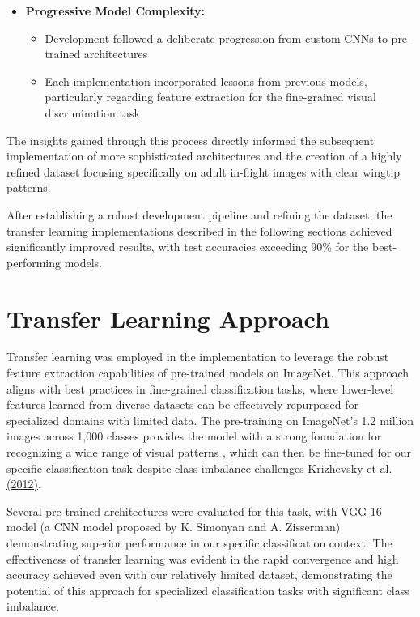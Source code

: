 \documentclass[a4paper,12pt]{report}
\begin{document}
\begin{itemize}
    \item \textbf{Progressive Model Complexity:}
    \begin{itemize}
        \item Development followed a deliberate progression from custom CNNs to pre-trained architectures
        \item Each implementation incorporated lessons from previous models, particularly regarding feature extraction for the fine-grained visual discrimination task
    \end{itemize}
\end{itemize}

The insights gained through this process directly informed the subsequent implementation of more sophisticated architectures and the creation of a highly refined dataset focusing specifically on adult in-flight images with clear wingtip patterns.

After establishing a robust development pipeline and refining the dataset, the transfer learning implementations described in the following sections achieved significantly improved results, with test accuracies exceeding 90\% for the best-performing models.


\section{Transfer Learning Approach}

Transfer learning was employed in the implementation to leverage the robust feature extraction capabilities of pre-trained models on ImageNet. This approach aligns with best practices in fine-grained classification tasks, where lower-level features learned from diverse datasets can be effectively repurposed for specialized domains with limited data. The pre-training on ImageNet's 1.2 million images across 1,000 classes provides the model with a strong foundation for recognizing a wide range of visual patterns \citep{krizhevsky2012imagenet}, which can then be fine-tuned for our specific classification task despite class imbalance challenges \href{https://proceedings.neurips.cc/paper/2012/file/c399862d3b9d6b76c8436e924a68c45b-Paper.pdf}{Krizhevsky et al. (2012)}.


Several pre-trained architectures were evaluated for this task, with VGG-16 model (a CNN model proposed by K. Simonyan and A. Zisserman) demonstrating superior performance in our specific classification context. The effectiveness of transfer learning was evident in the rapid convergence and high accuracy achieved even with our relatively limited dataset, demonstrating the potential of this approach for specialized classification tasks with significant class imbalance.
\end{document}
